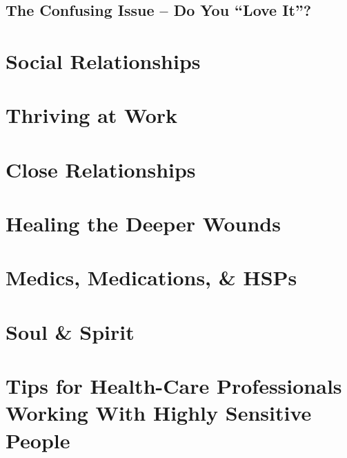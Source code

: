 \documentclass{article}
\numberwithin{equation}{section}
\begin{document}
\subsection{The Confusing Issue -- Do You ``Love It''?}


\section{Social Relationships}


\section{Thriving at Work}


\section{Close Relationships}


\section{Healing the Deeper Wounds}


\section{Medics, Medications, \& HSPs}


\section{Soul \& Spirit}


\section{Tips for Health-Care Professionals Working With Highly Sensitive People}
\end{document}
